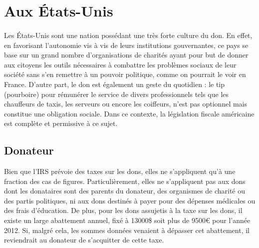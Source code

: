    \section{Aux États-Unis}
        \paragraph{}
            Les États-Unis sont une nation possédant une très forte culture
            du don. En effet, en favorisant l'autonomie vis à vis de leurs
            institutions gouvernantes, ce pays se base sur un grand nombre
            d'organisations de charités ayant pour but de donner aux citoyens
            les outils nécessaires à combattre les problèmes sociaux de leur
            société sans s'en remettre à un pouvoir politique, comme on
            pourrait le voir en France.
            D'autre part, le don est également un geste du quotidien :
            le tip (pourboire) pour rémunérer le service de divers
            professionnels tels que les chauffeurs de taxis, les serveurs ou
            encore les coiffeurs, n'est pas optionnel mais constitue une
            obligation sociale.
            Dans ce contexte, la législation fiscale américaine est
            complète et permissive à ce sujet.
        \subsection{Donateur}
            Bien que l'IRS prévoie des taxes sur les dons, elles ne
            s'appliquent qu'à une fraction des cas de figures.
            Particulièrement, elles ne s'appliquent pas aux dons dont les
            donataires sont des parents du donateur, des organismes de
            charité ou des partis politiques, ni aux dons destinés à payer
            pour des dépenses médicales ou des frais d'éducation.
            De plus, pour les dons assujetis à la taxe sur les dons, il
            existe un large abattement annuel, fixé à 13000\$ soit plus
            de 9500\euro{} pour l'année 2012. Si, malgré cela, les sommes
            données venaient à dépasser cet abattement, il reviendrait au
            donateur de s'acquitter de cette taxe.
